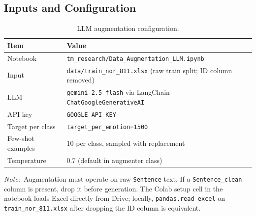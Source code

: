 \documentclass[11pt,a4paper]{article}
\newcommand{\repo}[1]{\texttt{#1}}
\newcommand{\note}[1]{\textit{Note:}~#1}
\begin{document}
\subsection{Inputs and Configuration}
\begin{table}[htbp]
  \centering
  \caption{LLM augmentation configuration.}
  \label{tab:augmentation}
  \begin{tabular}{@{}ll@{}}
    \toprule
    Item & Value \\
    \midrule
    Notebook & \repo{tm\_research/Data\_Augmentation\_LLM.ipynb} \\
    Input & \repo{data/train\_nor\_811.xlsx} (raw train split; ID column removed) \\
    LLM & \texttt{gemini-2.5-flash} via LangChain \texttt{ChatGoogleGenerativeAI} \\
    API key & \texttt{GOOGLE\_API\_KEY} \\
    Target per class & \texttt{target\_per\_emotion=1500} \\
    Few-shot examples & 10 per class, sampled with replacement \\
    Temperature & 0.7 (default in augmenter class) \\
    \bottomrule
  \end{tabular}
\end{table}

\note{Augmentation must operate on raw \texttt{Sentence} text. If a \texttt{Sentence\_clean} column is present, drop it before generation. The Colab setup cell in the notebook loads Excel directly from Drive; locally, \texttt{pandas.read\_excel} on \repo{train\_nor\_811.xlsx} after dropping the ID column is equivalent.}
\end{document}

